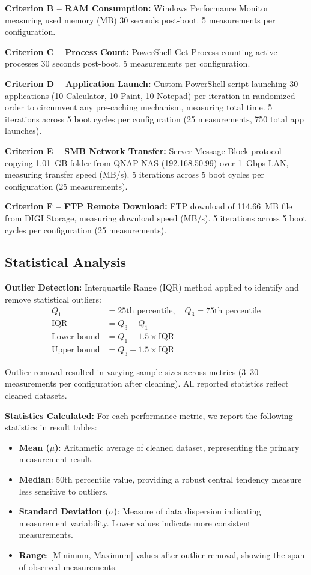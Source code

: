\documentclass[runningheads,a4paper,english]{llncs}[2022/01/12]
\begin{document}
\textbf{Criterion B -- RAM Consumption:} Windows Performance Monitor measuring used memory (MB) 30 seconds post-boot. 5 measurements per configuration.

\textbf{Criterion C -- Process Count:} PowerShell Get-Process counting active processes 30 seconds post-boot. 5 measurements per configuration.

\textbf{Criterion D -- Application Launch:} Custom PowerShell script launching 30 applications (10 Calculator, 10 Paint, 10 Notepad) per iteration in randomized order to circumvent any pre-caching mechanism, measuring total time. 5 iterations across 5 boot cycles per configuration (25 measurements, 750 total app launches).

\textbf{Criterion E -- SMB Network Transfer:} Server Message Block protocol copying 1.01~GB folder from QNAP NAS (192.168.50.99) over 1~Gbps LAN, measuring transfer speed (MB/s). 5 iterations across 5 boot cycles per configuration (25 measurements).

\textbf{Criterion F -- FTP Remote Download:} FTP download of 114.66~MB file from DIGI Storage, measuring download speed (MB/s). 5 iterations across 5 boot cycles per configuration (25 measurements).

\subsection{Statistical Analysis}

\textbf{Outlier Detection:} Interquartile Range (IQR) method applied to identify and remove statistical outliers:
\begin{align*}
Q_1 &= \text{25th percentile}, \quad Q_3 = \text{75th percentile} \\
\text{IQR} &= Q_3 - Q_1 \\
\text{Lower bound} &= Q_1 - 1.5 \times \text{IQR} \\
\text{Upper bound} &= Q_3 + 1.5 \times \text{IQR}
\end{align*}

Outlier removal resulted in varying sample sizes across metrics (3--30 measurements per configuration after cleaning). All reported statistics reflect cleaned datasets.

\textbf{Statistics Calculated:} For each performance metric, we report the following statistics in result tables:

\begin{itemize}
\item \textbf{Mean ($\mu$)}: Arithmetic average of cleaned dataset, representing the primary measurement result.
\item \textbf{Median}: 50th percentile value, providing a robust central tendency measure less sensitive to outliers.
\item \textbf{Standard Deviation ($\sigma$)}: Measure of data dispersion indicating measurement variability. Lower values indicate more consistent measurements.
\item \textbf{Range}: [Minimum, Maximum] values after outlier removal, showing the span of observed measurements.
\end{itemize}
\end{document}
